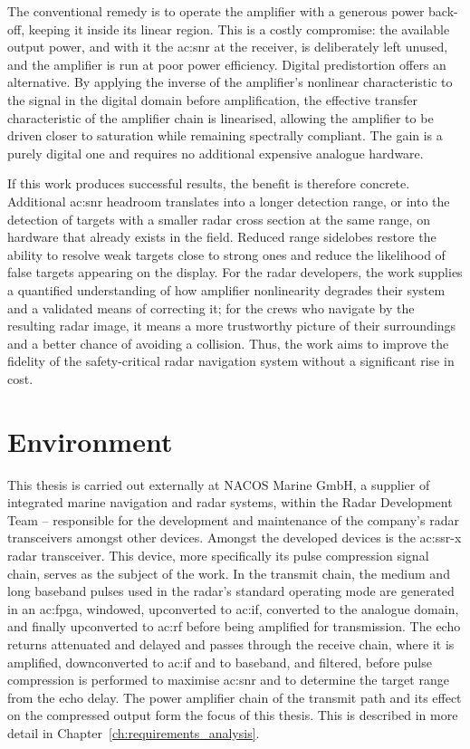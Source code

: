 The conventional remedy is to operate the amplifier with a generous power back-off, keeping it inside its linear region. This is a costly compromise: the available output power, and with it the \gls{ac:snr} at the receiver, is deliberately left unused, and the amplifier is run at poor power efficiency. Digital predistortion offers an alternative. By applying the inverse of the amplifier's nonlinear characteristic to the signal in the digital domain before amplification, the effective transfer characteristic of the amplifier chain is linearised, allowing the amplifier to be driven closer to saturation while remaining spectrally compliant. The gain is a purely digital one and requires no additional expensive analogue hardware.

If this work produces successful results, the benefit is therefore concrete. Additional \gls{ac:snr} headroom translates into a longer detection range, or into the detection of targets with a smaller radar cross section at the same range, on hardware that already exists in the field. Reduced range sidelobes restore the ability to resolve weak targets close to strong ones and reduce the likelihood of false targets appearing on the display. For the radar developers, the work supplies a quantified understanding of how amplifier nonlinearity degrades their system and a validated means of correcting it; for the crews who navigate by the resulting radar image, it means a more trustworthy picture of their surroundings and a better chance of avoiding a collision. Thus, the work aims to improve the fidelity of the safety-critical radar navigation system without a significant rise in cost.

\section{Environment}

This thesis is carried out externally at NACOS Marine GmbH, a supplier of integrated marine navigation and radar systems, within the Radar Development Team -- responsible for the development and maintenance of the company's radar transceivers amongst other devices. Amongst the developed devices is the \gls{ac:ssr-x} radar transceiver. This device, more specifically its pulse compression signal chain, serves as the subject of the work. In the transmit chain, the medium and long baseband pulses used in the radar's standard operating mode are generated in an \gls{ac:fpga}, windowed, upconverted to \gls{ac:if}, converted to the analogue domain, and finally upconverted to \gls{ac:rf} before being amplified for transmission. The echo returns attenuated and delayed and passes through the receive chain, where it is amplified, downconverted to \gls{ac:if} and to baseband, and filtered, before pulse compression is performed to maximise \gls{ac:snr} and to determine the target range from the echo delay. The power amplifier chain of the transmit path and its effect on the compressed output form the focus of this thesis. This is described in more detail in Chapter~\ref{ch:requirements_analysis}.

